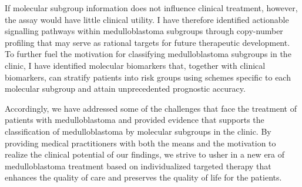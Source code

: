 If molecular subgroup information does not influence clinical treatment, however, the assay would have little clinical utility. I have therefore identified actionable signalling pathways within medulloblastoma subgroups through copy-number profiling that may serve as rational targets for future therapeutic development. To further fuel the motivation for classifying medulloblastoma subgroups in the clinic, I have identified molecular biomarkers that, together with clinical biomarkers, can stratify patients into risk groups using schemes specific to each molecular subgroup and attain unprecedented prognostic accuracy.

Accordingly, we have addressed some of the challenges that face the treatment of patients with medulloblastoma and provided evidence that supports the classification of medulloblastoma by molecular subgroups in the clinic. By providing medical practitioners with both the means and the motivation to realize the clinical potential of our findings, we strive to usher in a new era of medulloblastoma treatment based on individualized targeted therapy that enhances the quality of care and preserves the quality of life for the patients.

